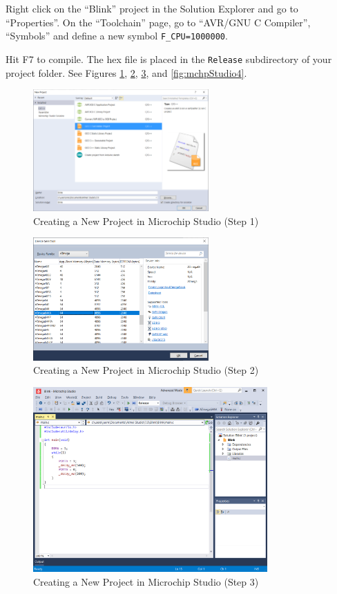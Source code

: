 \documentclass{article}
\newcommand{\file}[1]{\texttt{#1}}
\begin{document}
Right click on the ``Blink'' project in the Solution Explorer and go to ``Properties''. On the ``Toolchain'' page, go to ``AVR/GNU C Compiler'', ``Symbols'' and define a new symbol \texttt{F\_CPU=1000000}. 

Hit F7 to compile. The hex file is placed in the \file{Release} subdirectory of your project folder. See Figures \ref{fig:mchpStudio1}, \ref{fig:mchpStudio2}, \ref{fig:mchpStudio3}, and \ref{fig:mchpStudio4}. 

\begin{figure}[htb]
\centering
\includegraphics[width=0.6\textwidth]{Pictures/MchpStudio1.png}
\caption{Creating a New Project in Microchip Studio (Step 1)}
\label{fig:mchpStudio1}
\end{figure}

\begin{figure}[htb]
\centering
\includegraphics[width=0.6\textwidth]{Pictures/MchpStudio2.png}
\caption{Creating a New Project in Microchip Studio (Step 2)}
\label{fig:mchpStudio2}
\end{figure}

\begin{figure}[htb]
\centering
\includegraphics[width=0.8\textwidth]{Pictures/MchpStudio3.png}
\caption{Creating a New Project in Microchip Studio (Step 3)}
\label{fig:mchpStudio3}
\end{figure}
\end{document}
